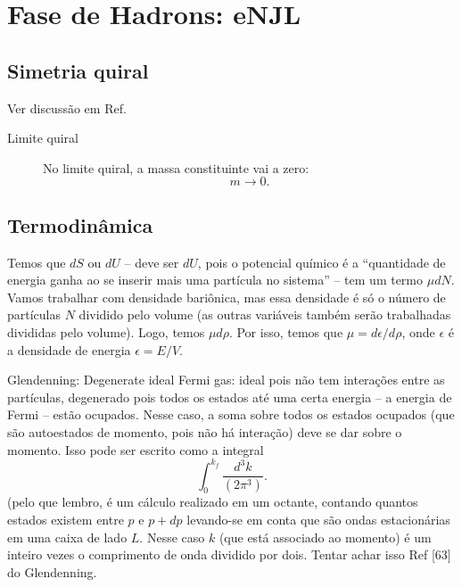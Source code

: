 \chapter{Fase de Hadrons: eNJL}

\section{Simetria quiral}

Ver discussão em Ref.\cite{Vogl}

\begin{description}
	\item[Limite quiral] No limite quiral, a massa constituinte vai a zero:
		\begin{equation}
			m \to 0.
		\end{equation}
\end{description}

\section{Termodinâmica}

Temos que $dS$ ou $dU$ -- deve ser $dU$, pois o potencial químico é a ``quantidade de energia ganha ao se inserir mais uma partícula no sistema'' -- tem um termo $\mu dN$. Vamos trabalhar com densidade bariônica, mas essa densidade é só o número de partículas $N$ dividido pelo volume (as outras variáveis também serão trabalhadas divididas pelo volume). Logo, temos $\mu d\rho$. Por isso, temos que $\mu = d\epsilon/d\rho$, onde $\epsilon$ é a densidade de energia $\epsilon = E/V$. 

Glendenning\cite{Glendenning}:
Degenerate ideal Fermi gas: ideal pois não tem interações entre as partículas, degenerado pois todos os estados até uma certa energia -- a energia de Fermi -- estão ocupados. Nesse caso, a soma sobre todos os estados ocupados (que são autoestados de momento, pois não há interação) deve se dar sobre o momento. Isso pode ser escrito como a integral
\begin{equation}
	\int_0^{k_f} \frac{d^3k}{(2\pi^3)}.
\end{equation}
%
(pelo que lembro, é um cálculo realizado em um octante, contando quantos estados existem entre $p$ e $p+dp$ levando-se em conta que são ondas estacionárias em uma caixa de lado $L$. Nesse caso $k$ (que está associado ao momento) é um inteiro vezes o comprimento de onda dividido por dois. Tentar achar isso Ref [63] do Glendenning.

